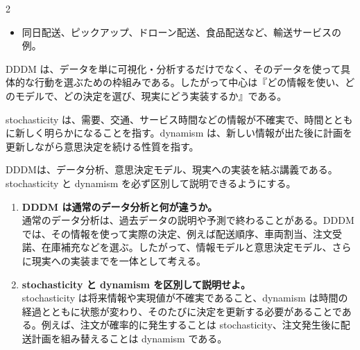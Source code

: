 \begin{multicols}{2}

\footnotesize

\raggedcolumns


\begin{itemize}
\item 同日配送、ピックアップ、ドローン配送、食品配送など、輸送サービスの例。
\end{itemize}

DDDM は、データを単に可視化・分析するだけでなく、そのデータを使って具体的な行動を選ぶための枠組みである。したがって中心は『どの情報を使い、どのモデルで、どの決定を選び、現実にどう実装するか』である。\par

stochasticity は、需要、交通、サービス時間などの情報が不確実で、時間とともに新しく明らかになることを指す。dynamism は、新しい情報が出た後に計画を更新しながら意思決定を続ける性質を指す。\par

DDDMは、データ分析、意思決定モデル、現実への実装を結ぶ講義である。stochasticity と dynamism を必ず区別して説明できるようにする。\par

\begin{enumerate}
\item \textbf{DDDM は通常のデータ分析と何が違うか。}\\
通常のデータ分析は、過去データの説明や予測で終わることがある。DDDMでは、その情報を使って実際の決定、例えば配送順序、車両割当、注文受諾、在庫補充などを選ぶ。したがって、情報モデルと意思決定モデル、さらに現実への実装までを一体として考える。
\item \textbf{stochasticity と dynamism を区別して説明せよ。}\\
stochasticity は将来情報や実現値が不確実であること、dynamism は時間の経過とともに状態が変わり、そのたびに決定を更新する必要があることである。例えば、注文が確率的に発生することは stochasticity、注文発生後に配送計画を組み替えることは dynamism である。
\end{enumerate}

\end{multicols}

\clearpage



